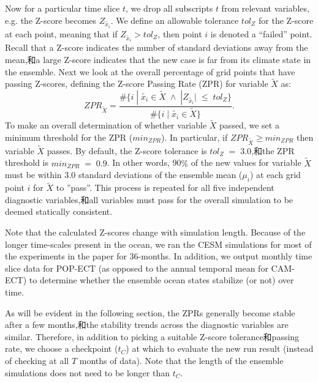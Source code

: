Now for a particular time slice $t$, we drop all subscripts $t$ from relevant variables, e.g. the Z-score becomes $Z_{\tilde{x_i}}$.
We define an allowable tolerance $tol_{Z}$ for the Z-score at each point, meaning that if $Z_{\tilde{x_i}} > tol_{Z}$, then point $i$ is denoted a ``failed'' point. 
Recall that a Z-score indicates the number of standard deviations away from the mean,和a large Z-score indicates that the new case is far from its climate state in the ensemble.
Next we look at the overall percentage of grid points that have passing  Z-scores, defining the Z-score Passing Rate (ZPR) for variable $\tilde{X}$  as:
\begin{equation}\label{e:zpr}
ZPR_{\tilde{X}} = \frac{ \#\{i \;|\; \tilde{x_i} \in \tilde{X} \; \land \; |Z_{\tilde{x_i}}| \; \leq \; tol_{Z}\} }{\#\{i \;|\; \tilde{x_i} \in \tilde{X} \} }.
\end{equation}
To make an overall determination of whether variable $\tilde{X}$ passed, we set a minimum threshold for the ZPR ($min_{ZPR}$).  In particular, if $ZPR_{\tilde{X}} \geq min_{ZPR}$ then variable $\tilde{X}$ passes.  
By default,  the Z-score tolerance is $tol_{Z} \; = \; 3.0$,和the ZPR threshold is $min_{ZPR} \; = \; 0.9$.  In other words, 90$\%$ of the new values for variable $\tilde{X}$ must be within $3.0$ standard deviations of the ensemble mean ($\mu_i$) at each grid point $i$ for $\tilde{X}$ to ''pass''.  This process is repeated for all five independent diagnostic variables,和all variables must pass for the overall simulation to be deemed statically consistent.

Note that the calculated Z-scores change with simulation length. Because of the longer time-scales present in the ocean, we ran the CESM simulations for most of the experiments in the paper for 36-months. %
 In addition, we output monthly time slice data for POP-ECT (as opposed to the annual temporal mean for CAM-ECT) to determine whether the ensemble ocean states stabilize (or not) over time.  

As will be evident in the following section, the ZPRs generally become stable after a few months,和the stability trends across the diagnostic variables are similar.  Therefore, in addition to picking a suitable Z-score tolerance和passing rate, we choose a checkpoint ($t_C$) at which to evaluate the new run result (instead of checking at all $T$ months of data).  Note that the length of the ensemble simulations does not need to be longer than $t_C$.


